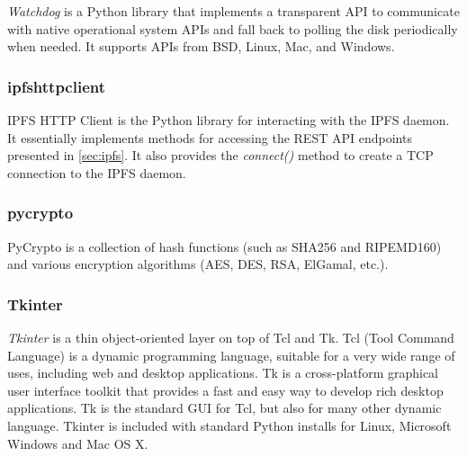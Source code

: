 \documentclass[12pt]{report}
\begin{document}
\textit{Watchdog} is a Python library that implements a transparent API to communicate with native operational system APIs and fall back to polling the disk periodically when needed. It supports APIs from BSD, Linux, Mac, and Windows. 

\subsubsection{ipfshttpclient \cite{ipfshttpclient}}

IPFS HTTP Client is the Python library for interacting with the IPFS daemon. It essentially implements methods for accessing the REST API endpoints presented in \ref{sec:ipfs}. It also provides the \textit{connect()} method to create a TCP connection to the IPFS daemon. 

\subsubsection{pycrypto \cite{pycrypto}}

PyCrypto is a collection of hash functions (such as SHA256 and RIPEMD160) and various encryption algorithms (AES, DES, RSA, ElGamal, etc.). 

\subsubsection{Tkinter \cite{tkinter}}

\textit{Tkinter} is a thin object-oriented layer on top of Tcl and Tk. Tcl (Tool Command Language) is a dynamic programming language, suitable for a very wide range of uses, including web and desktop applications. Tk is a cross-platform graphical user interface toolkit that provides a fast and easy way to develop rich desktop applications. Tk is the standard GUI for Tcl, but also for many other dynamic language. Tkinter is included with standard Python installs for Linux, Microsoft Windows and Mac OS X.
\end{document}
